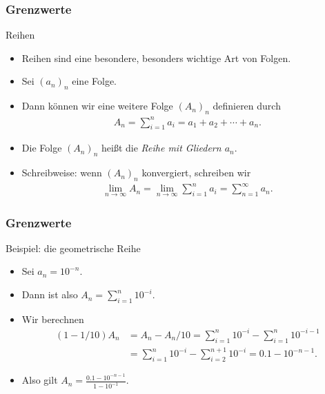 \documentclass{beamer}
\renewcommand{\emph}[1]{{\textcolor{solarizedRed}{\itshape #1}}}
\renewcommand{\oe}{\"o}
\newcommand{\mytitle}{Grenzwerte}
\begin{document}
\begin{frame}\frametitle{\mytitle}
	\begin{block}{Reihen}
		\begin{itemize}
			\item Reihen sind eine besondere, besonders wichtige Art von Folgen.
			\item Sei $(a_n)_n$ eine Folge.
			\item Dann k\oe nnen wir eine weitere Folge $(A_n)_n$ definieren durch
				\begin{align*}
					A_n=\sum_{i=1}^na_i=a_1+a_2+\cdots+a_n.
				\end{align*}
			\item Die Folge $(A_n)_n$ hei\ss t die \emph{Reihe mit Gliedern $a_n$}.
			\item \alert{Schreibweise:} wenn $(A_n)_n$ konvergiert, schreiben wir
				\begin{align*}
					\lim_{n\to\infty}A_n=\lim_{n\to\infty}\sum_{i=1}^na_i=\sum_{n=1}^\infty a_n.
				\end{align*}
		\end{itemize}
	\end{block}
\end{frame}

\begin{frame}\frametitle{\mytitle}
	\begin{block}{Beispiel: die geometrische Reihe}
		\begin{itemize}
			\item Sei $a_n=10^{-n}$.
			\item Dann ist also $ A_n=\sum_{i=1}^n10^{-i} $.
			\item Wir berechnen
				\begin{align*}
					(1-1/10)A_n&=A_n-A_n/10=\sum_{i=1}^n10^{-i}-\sum_{i=1}^n10^{-i-1}\\
							   &=\sum_{i=1}^n10^{-i}-\sum_{i=2}^{n+1}10^{-i}=0.1-10^{-n-1}.
				\end{align*}
			\item Also gilt $\displaystyle A_n=\frac{0.1-10^{-n-1}}{1-10^{-1}}.  $
		\end{itemize}
	\end{block}
\end{frame}
\end{document}
